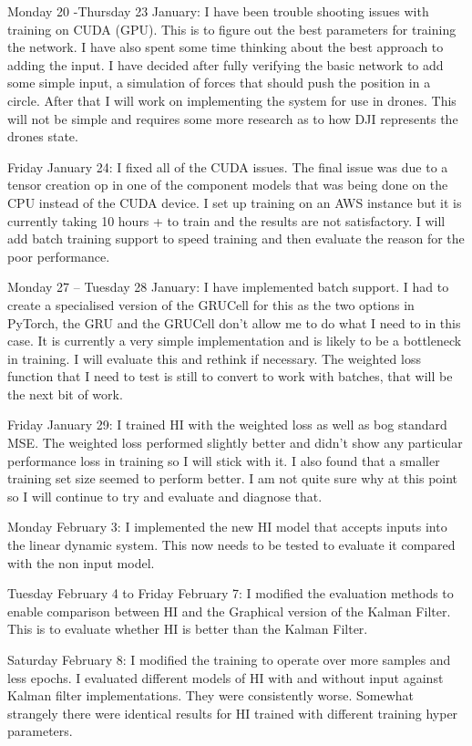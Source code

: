 \documentclass[]{../resources/final_report}
\begin{document}
\begin{appendices}
  Monday 20 -Thursday 23 January: I have been trouble shooting issues with training on CUDA (GPU). This is to figure out the best parameters for training the network. I have also spent some time thinking about the best approach to adding the input. I have decided after fully verifying the basic network to add some simple input, a simulation of forces that should push the position in a circle. After that I will work on implementing the system for use in drones. This will not be simple and requires some more research as to how DJI represents the drones state.

  Friday January 24: I fixed all of the CUDA issues. The final issue was due to a tensor creation op in one of the component models that was being done on the CPU instead of the CUDA device. I set up training on an AWS instance but it is currently taking 10 hours + to train and the results are not satisfactory. I will add batch training support to speed training and then evaluate the reason for the poor performance.

  Monday 27 – Tuesday 28 January: I have implemented batch support. I had to create a specialised version of the GRUCell for this as the two options in PyTorch, the GRU and the GRUCell don’t allow me to do what I need to in this case. It is currently a very simple implementation and is likely to be a bottleneck in training. I will evaluate this and rethink if necessary. The weighted loss function that I need to test is still to convert to work with batches, that will be the next bit of work.

  Friday January 29: I trained HI with the weighted loss as well as bog standard MSE. The weighted loss performed slightly better and didn’t show any particular performance loss in training so I will stick with it. I also found that a smaller training set size seemed to perform better. I am not quite sure why at this point so I will continue to try and evaluate and diagnose that.

  Monday February 3: I implemented the new HI model that accepts inputs into the linear dynamic system. This now needs to be tested to evaluate it compared with the non input model.

  Tuesday February 4 to Friday February 7: I modified the evaluation methods to enable comparison between HI and the Graphical version of the Kalman Filter. This is to evaluate whether HI is better than the Kalman Filter.

  Saturday February 8: I modified the training to operate over more samples and less epochs. I evaluated different models of HI with and without input against Kalman filter implementations. They were consistently worse. Somewhat strangely there were identical results for HI trained with different training hyper parameters.


\end{appendices}
\end{document}
